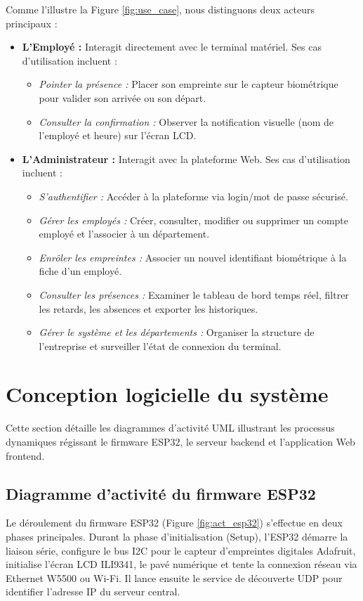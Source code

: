 \documentclass[12pt,a4paper]{report}
\begin{document}
Comme l'illustre la Figure \ref{fig:use_case}, nous distinguons deux acteurs principaux :
\begin{itemize}
    \item \textbf{L'Employé :} Interagit directement avec le terminal matériel. Ses cas d'utilisation incluent :
    \begin{itemize}
        \item \emph{Pointer la présence :} Placer son empreinte sur le capteur biométrique pour valider son arrivée ou son départ.
        \item \emph{Consulter la confirmation :} Observer la notification visuelle (nom de l'employé et heure) sur l'écran LCD.
    \end{itemize}
    \item \textbf{L'Administrateur :} Interagit avec la plateforme Web. Ses cas d'utilisation incluent :
    \begin{itemize}
        \item \emph{S'authentifier :} Accéder à la plateforme via login/mot de passe sécurisé.
        \item \emph{Gérer les employés :} Créer, consulter, modifier ou supprimer un compte employé et l'associer à un département.
        \item \emph{Enrôler les empreintes :} Associer un nouvel identifiant biométrique à la fiche d'un employé.
        \item \emph{Consulter les présences :} Examiner le tableau de bord temps réel, filtrer les retards, les absences et exporter les historiques.
        \item \emph{Gérer le système et les départements :} Organiser la structure de l'entreprise et surveiller l'état de connexion du terminal.
    \end{itemize}
\end{itemize}

\section{Conception logicielle du système}
Cette section détaille les diagrammes d'activité UML illustrant les processus dynamiques régissant le firmware ESP32, le serveur backend et l'application Web frontend.

\subsection{Diagramme d'activité du firmware ESP32}
Le déroulement du firmware ESP32 (Figure \ref{fig:act_esp32}) s'effectue en deux phases principales. Durant la phase d'initialisation (Setup), l'ESP32 démarre la liaison série, configure le bus I2C pour le capteur d'empreintes digitales Adafruit, initialise l'écran LCD ILI9341, le pavé numérique et tente la connexion réseau via Ethernet W5500 ou Wi-Fi. Il lance ensuite le service de découverte UDP pour identifier l'adresse IP du serveur central.
\end{document}
